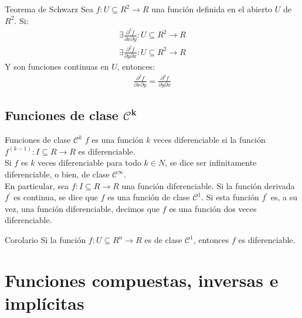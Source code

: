 \documentclass[a4paper, twoside]{article}
\numberwithin{equation}{section}
\numberwithin{figure}{section}
\numberwithin{table}{section}
\begin{document}
\begin{teorema*}{Teorema de Schwarz}
	Sea $f:U\subseteq R^2 \rightarrow R$ una función definida en el abierto $U$ de $R^2$. Si:
	\begin{align}
		\exists \frac{\partial^2 f}{\partial x\partial y}:U\subseteq R^2 \rightarrow R \\
		\exists \frac{\partial^2 f}{\partial y\partial x}:U\subseteq R^2 \rightarrow R
	\end{align}
	Y son funciones continuas en $U$, entonces:
	\begin{align}
		 \frac{\partial^2 f}{\partial x\partial y}=\frac{\partial^2 f}{\partial y\partial x}
	\end{align}
\end{teorema*}

\subsection{Funciones de clase $\mathcal{C}^{\mathbf{k}}$}
\begin{definicion*}{Funciones de clase $\mathcal{C}^k$}
	$f$ es una función $k$ veces diferenciable si la función $f^{(k-1)}:I\subseteq R \rightarrow R$ es diferenciable.\\
	
	Si $f$ es $k$ veces diferenciable para todo $k\in N$, se dice ser infinitamente diferenciable, o bien, de clase $\mathcal{C}^{\infty}$.\\
	
	En particular, sea $f:I\subseteq R \rightarrow R$ una función diferenciable. Si la función derivada $f^\prime$ es continua, se dice que $f$ es una función de clase $\mathcal{C}^{1}$. Si esta función $f^\prime$ es, a su vez, una función diferenciable, decimos que $f$ es una función dos veces diferenciable.
\end{definicion*}

\begin{corolario*}{Corolario}
	Si la función $f: U \subseteq R^n \rightarrow R$ es de clase $\mathcal{C}^{1}$, entonces $f$ es diferenciable.
\end{corolario*}

\newpage
\section{Funciones compuestas, inversas e implícitas}
\end{document}
